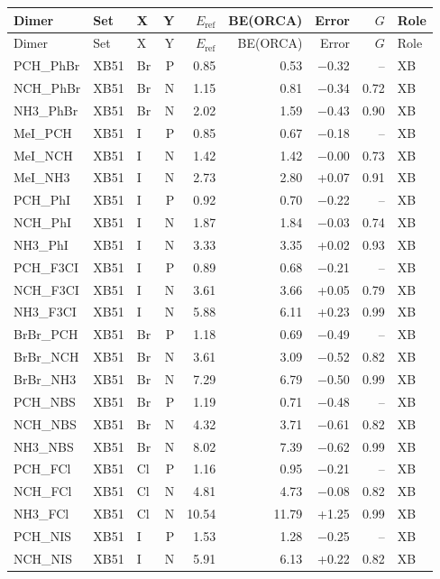 \documentclass[journal=jcisd8,manuscript=suppinfo]{achemso}
\begin{document}
\begin{singlespace}
{\begin{longtable}{lllrrrrrl}
\toprule
Dimer & Set & X & Y & $E_\mathrm{ref}$ & BE(ORCA) & Error & $G$ & Role\\
\midrule
\endfirsthead
\toprule
Dimer & Set & X & Y & $E_\mathrm{ref}$ & BE(ORCA) & Error & $G$ & Role\\
\midrule
\endhead
\bottomrule
\endlastfoot
PCH\_PhBr & XB51 & Br & P & 0.85 & 0.53 & $-$0.32 & -- & XB\\
NCH\_PhBr & XB51 & Br & N & 1.15 & 0.81 & $-$0.34 & 0.72 & XB\\
NH3\_PhBr & XB51 & Br & N & 2.02 & 1.59 & $-$0.43 & 0.90 & XB\\
MeI\_PCH & XB51 & I & P & 0.85 & 0.67 & $-$0.18 & -- & XB\\
MeI\_NCH & XB51 & I & N & 1.42 & 1.42 & $-$0.00 & 0.73 & XB\\
MeI\_NH3 & XB51 & I & N & 2.73 & 2.80 & +0.07 & 0.91 & XB\\
PCH\_PhI & XB51 & I & P & 0.92 & 0.70 & $-$0.22 & -- & XB\\
NCH\_PhI & XB51 & I & N & 1.87 & 1.84 & $-$0.03 & 0.74 & XB\\
NH3\_PhI & XB51 & I & N & 3.33 & 3.35 & +0.02 & 0.93 & XB\\
PCH\_F3CI & XB51 & I & P & 0.89 & 0.68 & $-$0.21 & -- & XB\\
NCH\_F3CI & XB51 & I & N & 3.61 & 3.66 & +0.05 & 0.79 & XB\\
NH3\_F3CI & XB51 & I & N & 5.88 & 6.11 & +0.23 & 0.99 & XB\\
BrBr\_PCH & XB51 & Br & P & 1.18 & 0.69 & $-$0.49 & -- & XB\\
BrBr\_NCH & XB51 & Br & N & 3.61 & 3.09 & $-$0.52 & 0.82 & XB\\
BrBr\_NH3 & XB51 & Br & N & 7.29 & 6.79 & $-$0.50 & 0.99 & XB\\
PCH\_NBS & XB51 & Br & P & 1.19 & 0.71 & $-$0.48 & -- & XB\\
NCH\_NBS & XB51 & Br & N & 4.32 & 3.71 & $-$0.61 & 0.82 & XB\\
NH3\_NBS & XB51 & Br & N & 8.02 & 7.39 & $-$0.62 & 0.99 & XB\\
PCH\_FCl & XB51 & Cl & P & 1.16 & 0.95 & $-$0.21 & -- & XB\\
NCH\_FCl & XB51 & Cl & N & 4.81 & 4.73 & $-$0.08 & 0.82 & XB\\
NH3\_FCl & XB51 & Cl & N & 10.54 & 11.79 & +1.25 & 0.99 & XB\\
PCH\_NIS & XB51 & I & P & 1.53 & 1.28 & $-$0.25 & -- & XB\\
NCH\_NIS & XB51 & I & N & 5.91 & 6.13 & +0.22 & 0.82 & XB\\

\end{longtable}}
\end{singlespace}
\end{document}
